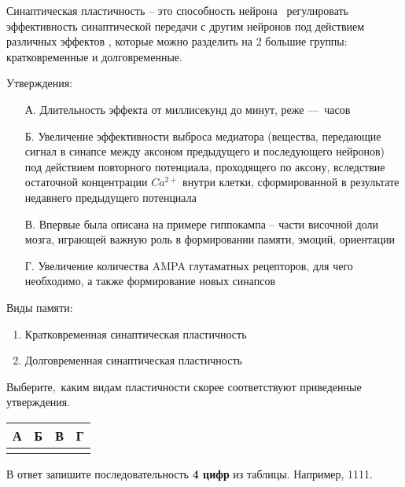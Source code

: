 
Синаптическая пластичность – это способность нейрона  регулировать эффективность синаптической передачи с другим нейронов под действием различных эффектов , которые можно разделить на 2 большие группы: кратковременные и долговременные.

Утверждения:
\begin{enumerate}
    \item[А.] Длительность эффекта от миллисекунд до минут, реже — часов
    \item[Б.] Увеличение эффективности выброса медиатора (вещества, передающие сигнал в синапсе между аксоном предыдущего и последующего нейронов) под действием повторного потенциала, проходящего по аксону, вследствие остаточной концентрации $Ca^{2+}$ внутри клетки, сформированной в результате недавнего предыдущего потенциала
    \item[В.] Впервые была описана на примере гиппокампа – части височной доли мозга, играющей важную роль в формировании памяти, эмоций, ориентации
    \item[Г.] Увеличение количества AMPA глутаматных рецепторов, для чего необходимо, а также формирование новых синапсов
\end{enumerate} 

Виды памяти:
\begin{enumerate}
    \item Кратковременная синаптическая пластичность
    \item Долговременная синаптическая пластичность
\end{enumerate}

Выберите, каким видам пластичности скорее соответствуют приведенные утверждения.

\begin{tabular}{|p{1.5cm}|p{1.5cm}|p{1.5cm}|p{1.5cm}|}
    \hline
    А&Б&В&Г\\
    \hline
    &&&\\
    \hline
\end{tabular}

В ответ запишите последовательность \textbf{4 цифр} из таблицы. Например, 1111.

